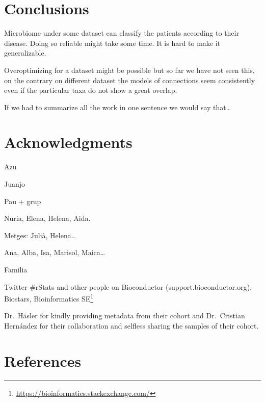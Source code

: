 \documentclass[
  a4paper,
]{book}
\DeclareRobustCommand{\href}[2]{#2\footnote{\url{#1}}}
\begin{document}
\hypertarget{conclusions}{%
\chapter{Conclusions}\label{conclusions}}

Microbiome under some dataset can classify the patients according to their disease.
Doing so reliable might take some time.
It is hard to make it generalizable.

Overoptimizing for a dataset might be possible but so far we have not seen this, on the contrary on different dataset the models of connections seem consistently even if the particular taxa do not show a great overlap.

If we had to summarize all the work in one sentence we would say that\ldots{}

\hypertarget{acknowledgments}{%
\chapter{Acknowledgments}\label{acknowledgments}}

Azu

Juanjo

Pau + grup

Nuria, Elena, Helena, Aida.

Metges: Julià, Helena\ldots{}

Ana, Alba, Isa, Marisol, Maica\ldots{}

Familia

Twitter \#rStats and other people on Bioconductor (support.bioconductor.org), Biostars, \href{https://bioinformatics.stackexchange.com/}{Bioinformatics SE}

Dr.~Häsler for kindly providing metadata from their cohort and Dr.~Cristian Hernández for their collaboration and selfless sharing the samples of their cohort.

\hypertarget{references}{%
\chapter*{References}\label{references}}
\end{document}
